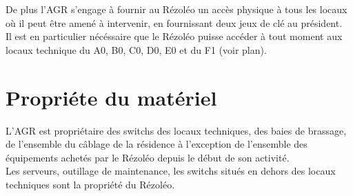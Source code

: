 \documentclass[12pt]{constitution}
\begin{document}
    De plus l'AGR s'engage à fournir au Rézoléo un accès physique à tous les locaux où il peut être amené à intervenir, en fournissant deux jeux de clé au président.\\

    Il est en particulier nécéssaire que le Rézoléo puisse accéder à tout moment aux locaux technique du A0, B0, C0, D0, E0 et du F1 (voir plan).\\


\section{Propriéte du matériel}

    L'AGR est propriétaire des switchs des locaux techniques, des baies de brassage, de l'ensemble du câblage de la résidence à l'exception de l'ensemble des équipements achetés par le Rézoléo depuis le début de son activité.\\

    Les serveurs, outillage de maintenance, les switchs situés en dehors des locaux techniques sont la propriété du Rézoléo.
\end{document}
